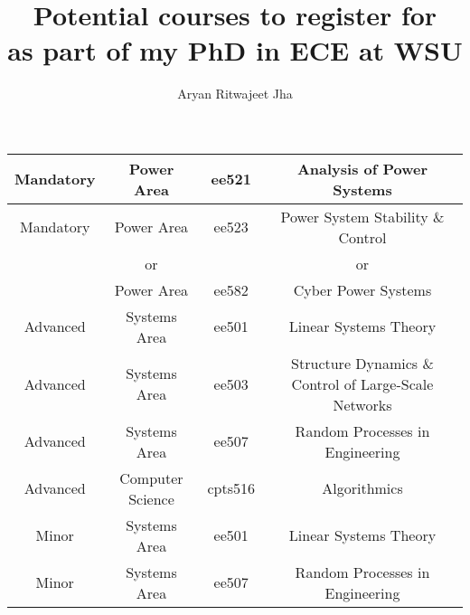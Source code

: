 \documentclass{article}
\author{Aryan Ritwajeet Jha}
\date{}
\title{Potential courses to register for \\ as part of my PhD in ECE at WSU}
\begin{document}
	\maketitle
	
	\begin{tabular}{|c|c|c|c}
		\hline
		Mandatory & Power Area & ee521 & Analysis of Power Systems \\
		\hline
		Mandatory & Power Area & ee523 & Power System Stability \& Control \\
		 & or &  & or \\
		 & Power Area & ee582 & Cyber Power Systems \\
		 \hline
		Advanced & Systems Area & ee501 & Linear Systems Theory \\ 
		\hline
		Advanced & Systems Area & ee503 & Structure Dynamics \& Control of Large-Scale Networks  \\ \hline
		Advanced& Systems Area  & ee507 & Random Processes in Engineering \\ \hline
		Advanced& Computer Science  & cpts516 & Algorithmics \\
		\hline
		Minor & Systems Area & ee501 & Linear Systems Theory \\
		\hline
		Minor & Systems Area & ee507 & Random Processes in Engineering \\
		\hline
	\end{tabular}
\end{document}
